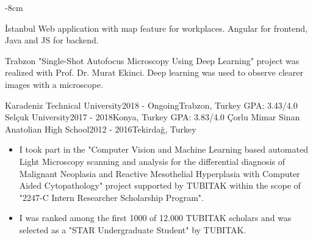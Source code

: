 \documentclass[10pt,a4paper]{altacv}
\begin{document}

\begin{adjustwidth}{}{-8cm}
\makecvheader
\end{adjustwidth}

 {İstanbul}
Web application with map feature for workplaces. Angular for frontend, Java and JS for backend.

\smallskip

 {Trabzon}
"Single-Shot Autofocus Microscopy Using Deep Learning" project was realized with Prof. Dr. Murat Ekinci. Deep learning was used to observe clearer images with a microscope.


 {Karadeniz Technical University}{2018 - Ongoing}{Trabzon, Turkey} 
\textsc{GPA}: 3.43/4.0
\smallskip
\cvevent{} {Selçuk University}{2017 - 2018}{Konya, Turkey} 
\textsc{GPA}: 3.83/4.0
\smallskip
\cvevent{} {Çorlu Mimar Sinan Anatolian High School}{2012 -  2016}{Tekirdağ, Turkey}




\begin{itemize}
    \item I took part in the "Computer Vision and Machine Learning based automated Light Microscopy scanning and analysis for the differential diagnosis of Malignant Neoplasia and Reactive Mesothelial Hyperplasia with Computer Aided Cytopathology" project supported by TUBITAK within the scope of "2247-C Intern Researcher Scholarship Program".
\end{itemize}


\begin{itemize}
    \item I was ranked among the first 1000 of 12.000 TUBITAK scholars and was selected as a "STAR Undergraduate Student" by TUBITAK.
\end{itemize}
\end{document}
